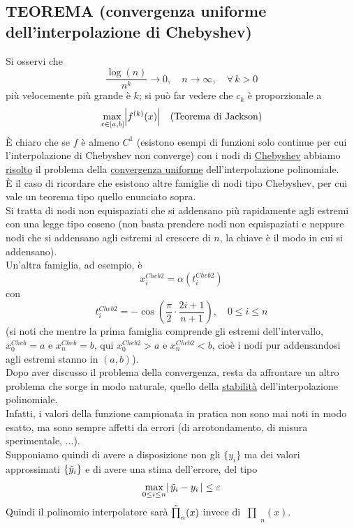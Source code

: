 \documentclass[12pt]{article}
\DeclarePairedDelimiter{\abs}{\lvert}{\rvert}
\newcommand{\inter}{\begin{matrix}\prod\end{matrix}}
\begin{document}
\subsection{TEOREMA (convergenza uniforme dell'interpolazione di Chebyshev)}
\begin{center}
    \fbox{\begin{minipage}[t]{15cm}%
        Sia $f \in C^k[a,b], \, k > 0$, 
        allora 
        \[ \exists \, c_k>0 : dist \left(f, \inter_n^{Cheb} \right) \le c_k \frac{\log (n)}{n^k}\]
    \end{minipage}}
\end{center}
Si osservi che 
\[ \frac{\log (n)}{n^k} \to 0, \quad n \to \infty, \quad \forall \, k > 0 \]
più velocemente più grande è $k$; si può far vedere che $c_k$ è proporzionale a 
\[\max_{x \in [a,b]} \abs*{f^{(k)}(x)} \quad \text{(Teorema di Jackson)}\]
È chiaro che se $f$ è almeno $C^1$ (esistono esempi di funzioni solo continue per cui l'interpolazione di Chebyshev non converge) con i nodi di \uline{Chebyshev} abbiamo \uline{risolto} il problema della \uline{convergenza uniforme} dell'interpolazione polinomiale.\\
È il caso di ricordare che esistono altre famiglie di nodi tipo Chebyshev, per cui vale un teorema tipo quello enunciato sopra.\\
Si tratta di nodi non equispaziati che si addensano più rapidamente agli estremi con una legge tipo coseno (non basta prendere nodi non equispaziati e neppure nodi che si addensano agli estremi al crescere di $n$, la chiave è il modo in cui si addensano).\\
Un'altra famiglia, ad esempio, è
\[x_i^{Cheb2} = \alpha(t_i^{Cheb2})\] con
\[t_i^{Cheb2} = - \cos{\left(\frac{\pi}{2}\cdot \frac{2i+1}{n+1}\right)}, \quad 0 \le i \le n\]
(si noti che mentre la prima famiglia comprende gli estremi dell'intervallo, $x_0^{Cheb}=a$ e $x_n^{Cheb}=b$, qui $x_0^{Cheb2}>a$ e $x_n^{Cheb2}<b$, cioè i nodi pur addensandosi agli estremi stanno in $(a,b)$).\\
Dopo aver discusso il problema della convergenza, resta da affrontare un altro problema che sorge in modo naturale, quello della \uline{stabilità} dell'interpolazione polinomiale.\\
Infatti, i valori della funzione campionata in pratica non sono mai noti in modo esatto, ma sono sempre affetti da errori (di arrotondamento, di misura sperimentale, $\dotso$).\\
Supponiamo quindi di avere a disposizione non gli $\{y_i\}$ ma dei valori approssimati $\{\Tilde{y}_i\}$ e di avere una stima dell'errore, del tipo
\[\max_{0 \le i \le n} \abs*{\,\Tilde{y}_i - y_i\,} \le \varepsilon\]
Quindi il polinomio interpolatore sarà $\Tilde{\inter}_n(x)$ invece di $\inter_n(x)$.
\end{document}
